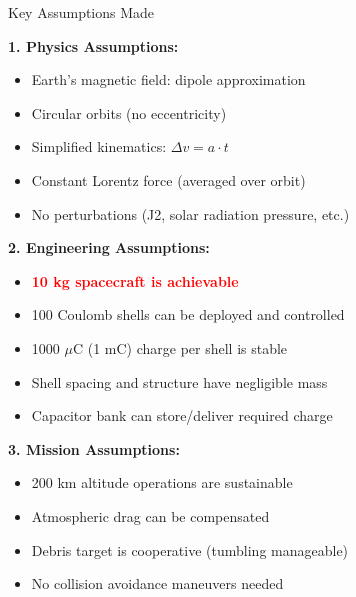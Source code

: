 \documentclass[11pt]{beamer}
\begin{document}
\begin{frame}{Key Assumptions Made}

\textbf{1. Physics Assumptions:}
\begin{itemize}
\item Earth's magnetic field: dipole approximation
\item Circular orbits (no eccentricity)
\item Simplified kinematics: $\Delta v = a \cdot t$
\item Constant Lorentz force (averaged over orbit)
\item No perturbations (J2, solar radiation pressure, etc.)
\end{itemize}

\vspace{0.2cm}

\textbf{2. Engineering Assumptions:}
\begin{itemize}
\item \textcolor{red}{\textbf{10 kg spacecraft is achievable}}
\item 100 Coulomb shells can be deployed and controlled
\item 1000 $\mu$C (1 mC) charge per shell is stable
\item Shell spacing and structure have negligible mass
\item Capacitor bank can store/deliver required charge
\end{itemize}

\vspace{0.2cm}

\textbf{3. Mission Assumptions:}
\begin{itemize}
\item 200 km altitude operations are sustainable
\item Atmospheric drag can be compensated
\item Debris target is cooperative (tumbling manageable)
\item No collision avoidance maneuvers needed
\end{itemize}

\end{frame}
\end{document}
